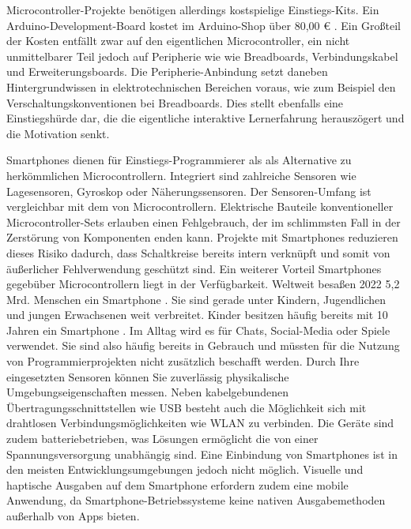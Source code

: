 \documentclass[11pt,a4paper]{report}
\begin{document}
Microcontroller-Projekte benötigen allerdings kostspielige Einstiegs-Kits.
Ein Arduino-Development-Board kostet im Arduino-Shop über 80,00 € \cite{arduino_kit}.
Ein Großteil der Kosten entfällt zwar auf den eigentlichen Microcontroller, ein nicht unmittelbarer Teil jedoch auf Peripherie wie wie Breadboards, Verbindungskabel und Erweiterungsboards.
Die Peripherie-Anbindung setzt daneben Hintergrundwissen in elektrotechnischen Bereichen voraus, wie zum Beispiel den Verschaltungskonventionen bei Breadboards.
Dies stellt ebenfalls eine Einstiegshürde dar, die die eigentliche interaktive Lernerfahrung herauszögert und die Motivation senkt.

Smartphones dienen für Einstiegs-Programmierer als als Alternative zu herkömmlichen Microcontrollern.
Integriert sind zahlreiche Sensoren wie Lagesensoren, Gyroskop oder Näherungssensoren.
Der Sensoren-Umfang ist vergleichbar mit dem von Microcontrollern.
Elektrische Bauteile konventioneller Microcontroller-Sets erlauben einen Fehlgebrauch, der im schlimmsten Fall in der Zerstörung von Komponenten enden kann.
Projekte mit Smartphones reduzieren dieses Risiko dadurch, dass Schaltkreise bereits intern verknüpft und somit von äußerlicher Fehlverwendung geschützt sind.
Ein weiterer Vorteil Smartphones gegebüber Microcontrollern liegt in der Verfügbarkeit.
Weltweit besaßen 2022 5,2 Mrd. Menschen ein Smartphone \cite{smartphone_users}.
Sie sind gerade unter Kindern, Jugendlichen und jungen Erwachsenen weit verbreitet.
Kinder besitzen häufig bereits mit 10 Jahren ein Smartphone \cite{bitkom_smartphones}.
Im Alltag wird es für Chats, Social-Media oder Spiele verwendet.
Sie sind also häufig bereits in Gebrauch und müssten für die Nutzung von Programmierprojekten nicht zusätzlich beschafft werden.
Durch Ihre eingesetzten Sensoren können Sie zuverlässig physikalische Umgebungseigenschaften messen.
Neben kabelgebundenen Übertragungsschnittstellen wie USB besteht auch die Möglichkeit sich mit drahtlosen Verbindungsmöglichkeiten wie WLAN zu verbinden.
Die Geräte sind zudem batteriebetrieben, was Lösungen ermöglicht die von einer Spannungsversorgung unabhängig sind.
Eine Einbindung von Smartphones ist in den meisten Entwicklungsumgebungen jedoch nicht möglich.
Visuelle und haptische Ausgaben auf dem Smartphone erfordern zudem eine mobile Anwendung, da Smartphone-Betriebssysteme keine nativen Ausgabemethoden außerhalb von Apps bieten.
\end{document}
